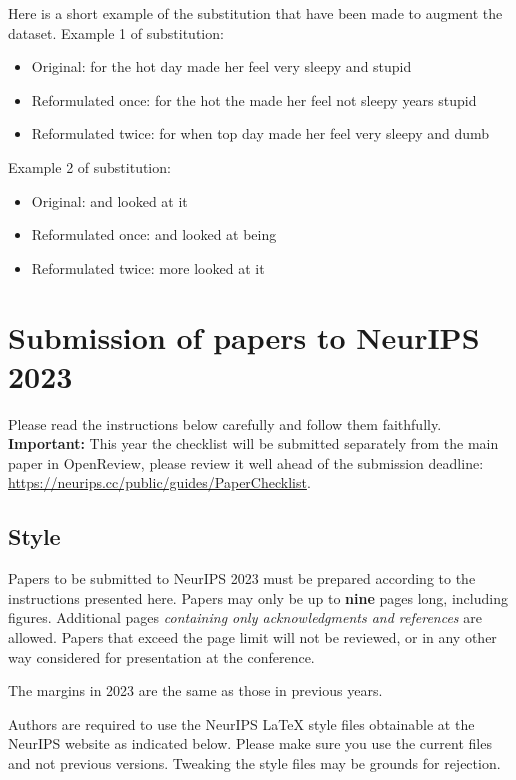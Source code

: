 \documentclass{article}
\begin{document}
Here is a short example of the substitution that have been made to augment the dataset.
Example 1 of substitution:
\begin{itemize}
    \item Original: for the hot day made her feel very sleepy and stupid
    \item Reformulated once: for the hot the made her feel not sleepy years stupid
    \item Reformulated twice: for when top day made her feel very sleepy and dumb
\end{itemize}
Example 2 of substitution:
\begin{itemize}
    \item Original: and looked at it 
    \item Reformulated once: and looked at being 
    \item Reformulated twice: more looked at it 
\end{itemize}

\newpage


\section{Submission of papers to NeurIPS 2023}

Please read the instructions below carefully and follow them faithfully. \textbf{Important:} This year the checklist will be submitted separately from the main paper in OpenReview, please review it well ahead of the submission deadline: \url{https://neurips.cc/public/guides/PaperChecklist}.


\subsection{Style}


Papers to be submitted to NeurIPS 2023 must be prepared according to the
instructions presented here. Papers may only be up to {\bf nine} pages long,
including figures. Additional pages \emph{containing only acknowledgments and
references} are allowed. Papers that exceed the page limit will not be
reviewed, or in any other way considered for presentation at the conference.


The margins in 2023 are the same as those in previous years.


Authors are required to use the NeurIPS \LaTeX{} style files obtainable at the
NeurIPS website as indicated below. Please make sure you use the current files
and not previous versions. Tweaking the style files may be grounds for
rejection.
\end{document}
